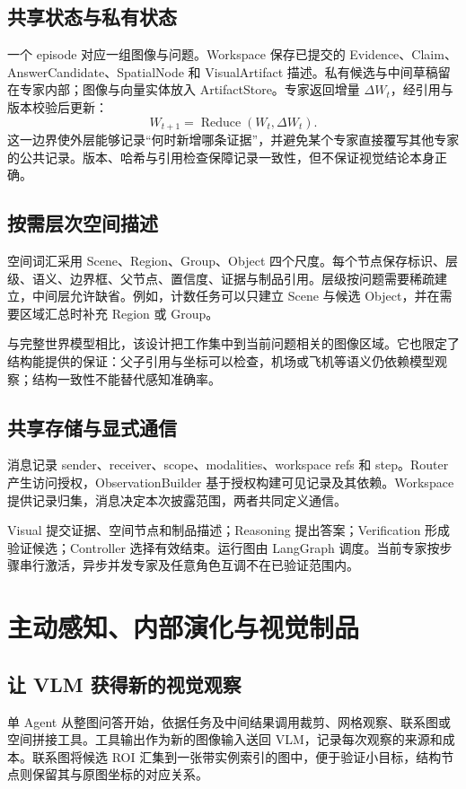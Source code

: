 \documentclass[UTF8,a4paper,zihao=5,fontset=fandol]{ctexart}
\begin{document}
\subsection{共享状态与私有状态}
一个 episode 对应一组图像与问题。Workspace 保存已提交的 Evidence、Claim、AnswerCandidate、SpatialNode 和 VisualArtifact 描述。私有候选与中间草稿留在专家内部；图像与向量实体放入 ArtifactStore。专家返回增量 $\Delta W_t$，经引用与版本校验后更新：
\begin{equation}
 W_{t+1}=\operatorname{Reduce}(W_t,\Delta W_t).
\end{equation}
这一边界使外层能够记录“何时新增哪条证据”，并避免某个专家直接覆写其他专家的公共记录。版本、哈希与引用检查保障记录一致性，但不保证视觉结论本身正确。

\subsection{按需层次空间描述}
空间词汇采用 Scene、Region、Group、Object 四个尺度。每个节点保存标识、层级、语义、边界框、父节点、置信度、证据与制品引用。层级按问题需要稀疏建立，中间层允许缺省。例如，计数任务可以只建立 Scene 与候选 Object，并在需要区域汇总时补充 Region 或 Group。

与完整世界模型相比，该设计把工作集中到当前问题相关的图像区域。它也限定了结构能提供的保证：父子引用与坐标可以检查，机场或飞机等语义仍依赖模型观察；结构一致性不能替代感知准确率。

\subsection{共享存储与显式通信}
消息记录 sender、receiver、scope、modalities、workspace refs 和 step。Router 产生访问授权，ObservationBuilder 基于授权构建可见记录及其依赖。Workspace 提供记录归集，消息决定本次披露范围，两者共同定义通信。

Visual 提交证据、空间节点和制品描述；Reasoning 提出答案；Verification 形成验证候选；Controller 选择有效结束。运行图由 LangGraph 调度。当前专家按步骤串行激活，异步并发专家及任意角色互调不在已验证范围内。

\newpage
\section{主动感知、内部演化与视觉制品}
\subsection{让 VLM 获得新的视觉观察}
单 Agent 从整图问答开始，依据任务及中间结果调用裁剪、网格观察、联系图或空间拼接工具。工具输出作为新的图像输入送回 VLM，记录每次观察的来源和成本。联系图将候选 ROI 汇集到一张带实例索引的图中，便于验证小目标，结构节点则保留其与原图坐标的对应关系。
\end{document}
